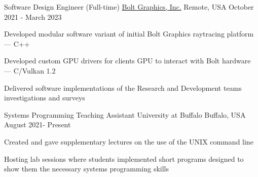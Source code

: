 

\begin{cventries}

  \cventry
    {Software Design Engineer (Full-time)} %
    {\href{https://www.bolt.graphics/}{Bolt Graphics, Inc.} } %
    {Remote, USA} %
    {October 2021 - March 2023} %
    {
      \begin{cvitems} %
        \item Developed modular software variant of initial Bolt Graphics raytracing platform --- C++
        \item Developed custom GPU drivers for clients GPU to interact with Bolt hardware --- C/Vulkan 1.2
        \item Delivered software implementations of the Research and Development teams investigations and surveys
      \end{cvitems}
    }
  \cventry
    {Systems Programming Teaching Assistant} %
    {University at Buffalo} %
    {Buffalo, USA} %
    {August 2021- Present} %
    {
      \begin{cvitems} %
        \item Created and gave supplementary lectures on the use of the UNIX command line
        \item Hosting lab sessions where students implemented short programs designed to show them the necessary systems programming skills
      \end{cvitems}
    }

\end{cventries}
